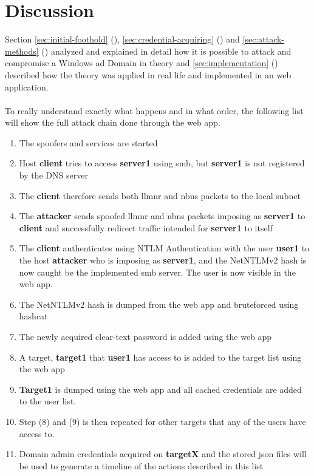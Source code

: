 \documentclass{article}
\begin{document}
\section{Discussion}
Section \ref{sec:initial-foothold} (), \ref{sec:credential-acquiring} () and \ref{sec:attack-methods} () analyzed and explained in detail how it is possible to attack and compromise a Windows \gls{ad} Domain in theory and \ref{sec:implementation} () described how the theory was applied in real life and implemented in an web application.
\\\\
To really understand exactly what happens and in what order, the following list will show the full attack chain done through the web app.

\begin{enumerate}
    \item The spoofers and services are started
    \item Host \textbf{client} tries to access \textbf{server1} using \gls{smb}, but \textbf{server1} is not registered by the DNS server
    \item The \textbf{client} therefore sends both \gls{llmnr} and \gls{nbns} packets to the local subnet
    \item The \textbf{attacker} sends spoofed \gls{llmnr} and \gls{nbns} packets imposing as \textbf{server1} to \textbf{client} and successfully redirect traffic intended for \textbf{server1} to itself
    \item The \textbf{client} authenticates using NTLM Authentication with the user \textbf{user1} to the host \textbf{attacker} who is imposing as \textbf{server1}, and the NetNTLMv2 hash is now caught be the implemented \gls{smb} server. The user is now visible in the web app.
    \item The NetNTLMv2 hash is dumped from the web app and bruteforced using hashcat
    \item The newly acquired clear-text password is added using the web app
    \item A target, \textbf{target1} that \textbf{user1} has access to is added to the target list using the web app
    \item \textbf{Target1} is dumped using the web app and all cached credentials are added to the user list.
    \item Step (8) and (9) is then repeated for other targets that any of the users have access to.
    \item Domain admin credentials acquired on \textbf{targetX} and the stored \gls{json} files will be used to generate a timeline of the actions described in this list
\end{enumerate}
\end{document}
